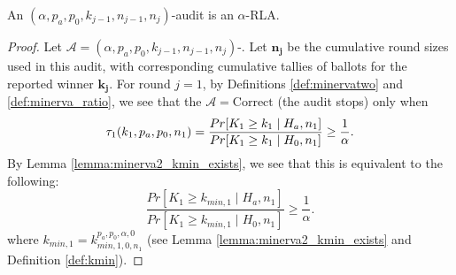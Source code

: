 \begin{theorem}
\label{thm:minerva2_is_rla_new}
An $(\alpha,p_a, p_0,k_{j-1},n_{j-1},n_j)$-\Providence audit is an
$\alpha$-RLA.
\end{theorem}
\begin{proof}
Let $\mathcal{A}=(\alpha,p_a, p_0,k_{j-1},n_{j-1},n_j)$-\Providence.
Let $\bm{n_j}$ be the cumulative round sizes used in this
audit, with corresponding cumulative tallies of
ballots for the reported winner $\bm{k_j}$.
For round $j=1$, by Definitions \ref{def:minervatwo}
and \ref{def:minerva_ratio}, we see that
the $\mathcal{A}=\text{Correct}$ (the audit stops) only when
$$
\tau_1(k_{1},p_a,p_0,n_1)\\
=\frac{Pr[K_{1} \geq k_{1} \mid H_a, n_1]}{Pr[K_{1} \geq k_{1} \mid H_0, n_1]}
\ge \frac{1}{\alpha}.
$$
By Lemma \ref{lemma:minerva2_kmin_exists}, we see that this
is equivalent to the following:
$$
\frac{Pr[K_{1} \geq k_{min,1} \mid H_a, n_1]}{Pr[K_{1} \geq k_{min, 1} \mid H_0, n_1]}
\ge \frac{1}{\alpha}.
$$
where $k_{min,1} = k^{p_a, p_0, \alpha, 0}_{min, 1, 0, n_1}$ (see Lemma \ref{lemma:minerva2_kmin_exists} and Definition \ref{def:kmin}). 


\end{proof}
